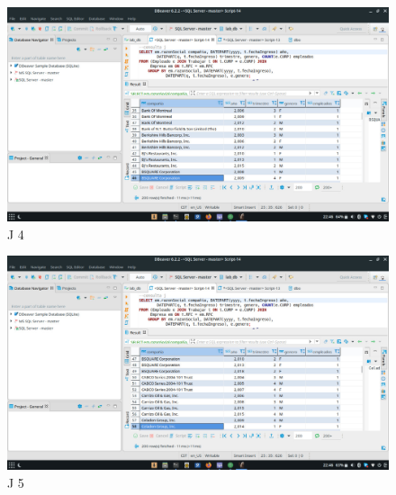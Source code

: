 \documentclass[a4paper, 12pt]{report}
\begin{document}
    \begin{figure}
        \includegraphics[width=\textwidth]
            {img/j4.jpeg}\hfill
    \caption{J 4}
    \end{figure}
    \begin{figure}
        \includegraphics[width=\textwidth]
            {img/j5.jpeg}\hfill
    \caption{J 5}
    \end{figure}
\end{document}
